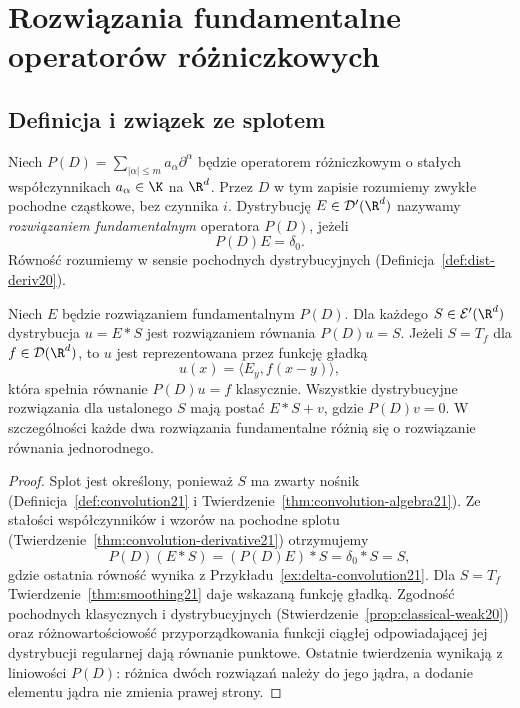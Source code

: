 \section{Rozwiązania fundamentalne operatorów różniczkowych}
\providecommand{\atlasref}[2]{#2}

\subsection{Definicja i związek ze splotem}

\begin{definicja}
\label{def:dt-fundamental-solution}
Niech $P(D)=\sum_{|\alpha|\le m}a_\alpha\partial^\alpha$
będzie operatorem różniczkowym o stałych współczynnikach
$a_\alpha\in\K$ na $\R^d$. Przez $D$ w tym zapisie
rozumiemy zwykłe pochodne cząstkowe, bez czynnika $i$.
Dystrybucję $E\in\mathcal D'(\R^d)$ nazywamy
\emph{rozwiązaniem fundamentalnym} operatora $P(D)$,
jeżeli
\[
 P(D)E=\delta_0.
\]
Równość rozumiemy w sensie pochodnych dystrybucyjnych
(Definicja~\ref{def:dist-deriv20}).
\end{definicja}

\begin{stwierdzenie}
\label{prop:dt-fundamental-convolution}
Niech $E$ będzie rozwiązaniem fundamentalnym $P(D)$.
Dla każdego $S\in\mathcal E'(\R^d)$ dystrybucja
$u=E*S$ jest rozwiązaniem równania $P(D)u=S$.
Jeżeli $S=T_f$ dla $f\in\mathcal D(\R^d)$, to $u$
jest reprezentowana przez funkcję gładką
\[
 u(x)=\langle E_y,f(x-y)\rangle,
\]
która spełnia równanie $P(D)u=f$ klasycznie.
Wszystkie dystrybucyjne rozwiązania dla ustalonego $S$
mają postać $E*S+v$, gdzie $P(D)v=0$.
W szczególności każde dwa rozwiązania fundamentalne
różnią się o rozwiązanie równania jednorodnego.
\end{stwierdzenie}
\begin{proof}
Splot jest określony, ponieważ $S$ ma zwarty nośnik
(Definicja~\ref{def:convolution21} i
Twierdzenie~\ref{thm:convolution-algebra21}).
Ze stałości współczynników i wzorów na pochodne
splotu (Twierdzenie~\ref{thm:convolution-derivative21})
otrzymujemy
\[
 P(D)(E*S)=(P(D)E)*S=\delta_0*S=S,
\]
gdzie ostatnia równość wynika z
Przykładu~\ref{ex:delta-convolution21}.
Dla $S=T_f$ Twierdzenie~\ref{thm:smoothing21}
daje wskazaną funkcję gładką. Zgodność pochodnych
klasycznych i dystrybucyjnych
(Stwierdzenie~\ref{prop:classical-weak20})
oraz różnowartościowość przyporządkowania funkcji
ciągłej odpowiadającej jej dystrybucji regularnej
dają równanie punktowe. Ostatnie twierdzenia
wynikają z liniowości $P(D)$: różnica dwóch
rozwiązań należy do jego jądra, a dodanie
elementu jądra nie zmienia prawej strony.
\end{proof}

